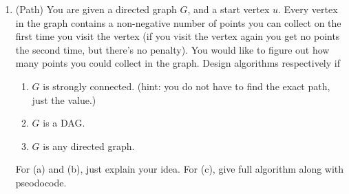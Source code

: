 \documentclass[12pt,a4paper]{article}
\theoremstyle{definition}
\begin{document}
\begin{enumerate}
\begin{enumerate}
\begin{proof}
        \textbf{Necessity ($\Rightarrow$):} Suppose $G$ is a good graph and let $T = (V, E')$ be the tree that is both a BFS-tree and a DFS-tree.
        Assume $G$ is not a tree. Then there exists an edge $e = \{u, v\} \in E \setminus E'$.
        Since $T$ is a BFS-tree, the depths of $u$ and $v$ in $T$ differ by at most $1$.
        Since $T$ is a DFS-tree of an undirected graph, every non-tree edge must be a back edge, i.e., one endpoint is an ancestor of the other, so their depth difference is at least $1$.
        Thus the depth difference is exactly $1$, meaning $u$ and $v$ are parent and child in $T$, and there exists a edge in $T$ that connects $u$ and $v$. But the edge $\{u, v\}$ is not in $T$, leads to contradiction.
        Hence no such edge exists, and $G = T$ is a tree.
        \end{proof}
        
        \item If $G$ is a \textbf{good directed acyclic graph}, prove or disprove that the vertex set $V$ can be sorted in an array $L$ such that $L$ is both an non-decreasing order of the distances from $s$ and a topological order.

        \medskip
        We disprove the statement by constructing a counterexample.
        Let $V = \{s, a, b, c\}$ and $E = \{s \to a,\; s \to b,\; b \to c,\; c \to a\}$.
        Clearly $G$ is a directed acyclic graph and every vertex is reachable from $s$.
        Define the spanning tree $T = (V, E')$ with $E' = \{s \to a,\; s \to b,\; b \to c\}$, T is both a BFS-tree and a DFS-tree.
        
        Thus $G$ is a good graph. The distance non-decreasing order requires $a$ and $b$ (distance $1$) to appear before $c$ (distance $2$).
        However, the edge $c \to a$ forces $c$ to precede $a$ in any topological order.
        These two requirements are contradictory.

    \end{enumerate}



    \item {\color{purple}(Path)} You are given a directed graph $G$, and a start vertex $u$. Every vertex in the graph contains a non-negative number of points you can collect on the first time you visit the vertex (if you visit the vertex again you get no points the second time, but there’s no penalty). You would like to figure out how many points you could collect in the graph. Design algorithms respectively if 
    \begin{enumerate}
        \item $G$ is strongly connected. (hint: you do not have to find the exact path, just the value.)
        \item $G$ is a DAG. 
        \item $G$ is any directed graph.
    \end{enumerate}
    For (a) and (b), just explain your idea. For (c), give full algorithm along with pseodocode.


\end{enumerate}
\end{document}
